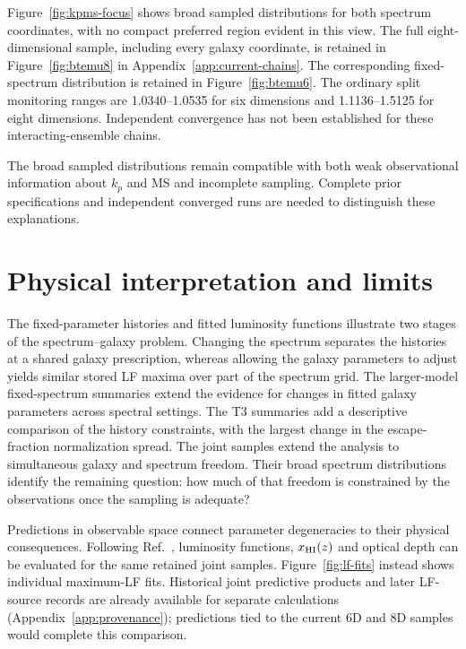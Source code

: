 Figure~\ref{fig:kpms-focus} shows broad sampled distributions for both spectrum coordinates, with no compact preferred region evident in this view. The full eight-dimensional sample, including every galaxy coordinate, is retained in Figure~\ref{fig:btemu8} in Appendix~\ref{app:current-chains}. The corresponding fixed-spectrum distribution is retained in Figure~\ref{fig:btemu6}. The ordinary split monitoring ranges are 1.0340--1.0535 for six dimensions and 1.1136--1.5125 for eight dimensions. Independent convergence has not been established for these interacting-ensemble chains.

The broad sampled distributions remain compatible with both weak observational information about $k_p$ and MS and incomplete sampling. Complete prior specifications and independent converged runs are needed to distinguish these explanations.


\section{Physical interpretation and limits}\label{initial-condition-scatter-and-limits-of-inference}

The fixed-parameter histories and fitted luminosity functions illustrate two stages of the spectrum--galaxy problem. Changing the spectrum separates the histories at a shared galaxy prescription, whereas allowing the galaxy parameters to adjust yields similar stored LF maxima over part of the spectrum grid. The larger-model fixed-spectrum summaries extend the evidence for changes in fitted galaxy parameters across spectral settings. The T3 summaries add a descriptive comparison of the history constraints, with the largest change in the escape-fraction normalization spread. The joint samples extend the analysis to simultaneous galaxy and spectrum freedom. Their broad spectrum distributions identify the remaining question: how much of that freedom is constrained by the observations once the sampling is adequate?

Predictions in observable space connect parameter degeneracies to their physical consequences. Following Ref.~\cite{Park2019}, luminosity functions, $x_{\rm HI}(z)$ and optical depth can be evaluated for the same retained joint samples. Figure~\ref{fig:lf-fits} instead shows individual maximum-LF fits. Historical joint predictive products and later LF-source records are already available for separate calculations (Appendix~\ref{app:provenance}); predictions tied to the current 6D and 8D samples would complete this comparison.

